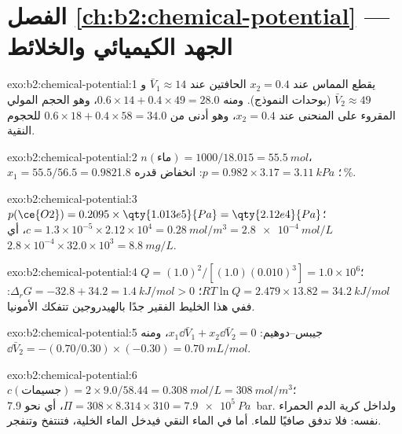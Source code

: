 \section*{الفصل \ref{ch:b2:chemical-potential} --- الجهد الكيميائي والخلائط}

\begin{solution}{exo:b2:chemical-potential:1}
يقطع المماس عند $x_2 = 0.4$ الحافتين عند $\bar V_1 \approx 14$ و$\bar
V_2 \approx 49$ (بوحدات النموذج). ومنه $0.6 \times 14 + 0.4 \times 49 = 28.0$،
وهو الحجم المولي المقروء على المنحنى عند $x_2 = 0.4$، وهو أدنى من
$0.6 \times 18 + 0.4 \times 58 = 34.0$ للحجوم النقية.
\end{solution}

\begin{solution}{exo:b2:chemical-potential:2}
$n(\text{ماء}) = 1000/18.015 = \qty{55.5}{mol}$، $x_1 = 55.5/56.5 = 0.982$؛
$p = 0.982 \times 3.17 = \qty{3.11}{kPa}$: انخفاض قدره 1.8\,\%.
\end{solution}

\begin{solution}{exo:b2:chemical-potential:3}
$p(\ce{O2}) = 0.2095 \times \qty{1.013e5}{Pa} = \qty{2.12e4}{Pa}$؛
$c = 1.3 \times 10^{-5} \times 2.12 \times 10^4 = \qty{0.28}{mol/m^3} =
\qty{2.8e-4}{mol/L}$، أي $2.8 \times 10^{-4} \times 32.0 \times 10^3 =
\qty{8.8}{mg/L}$.
\end{solution}

\begin{solution}{exo:b2:chemical-potential:4}
$Q = (1.0)^2/[(1.0)(0.010)^3] = 1.0 \times 10^6$؛ $RT\ln Q = 2.479 \times 13.82 =
\qty{34.2}{kJ/mol}$؛ $\Delta_r G = -32.8 + 34.2 = \qty{+1.4}{kJ/mol} > 0$: ففي هذا
الخليط الفقير جدًا بالهيدروجين تتفكك الأمونيا.
\end{solution}

\begin{solution}{exo:b2:chemical-potential:5}
جيبس--دوهيم: $x_1\dd\bar V_1 + x_2\dd\bar V_2 = 0$، ومنه $\dd\bar V_2 =
-(0.70/0.30) \times (-0.30) = \qty{+0.70}{mL/mol}$.
\end{solution}

\begin{solution}{exo:b2:chemical-potential:6}
$c(\text{جسيمات}) = 2 \times 9.0/58.44 = \qty{0.308}{mol/L} =
\qty{308}{mol/m^3}$؛ $\Pi = 308 \times 8.314 \times 310 = \qty{7.9e5}{Pa}$،
أي نحو \qty{7.9}{bar}. ولداخل كرية الدم الحمراء  نفسه:
فلا تدفق صافيًا للماء. أما في الماء النقي فيدخل الماء الخلية، فتنتفخ
وتنفجر.
\end{solution}

